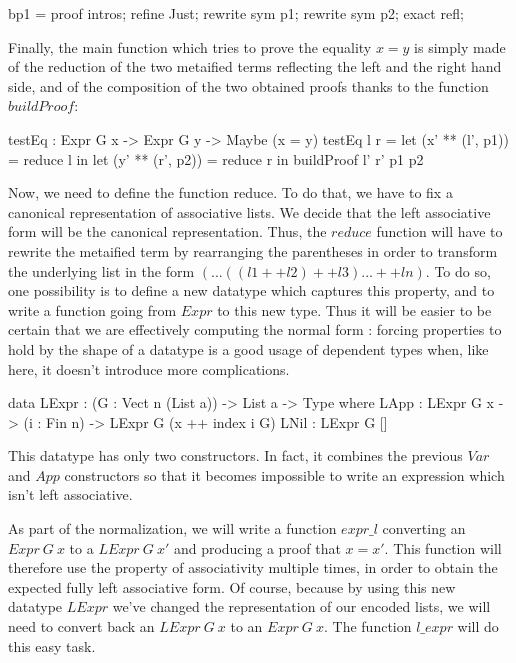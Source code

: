 \documentclass{sigplanconf}
\begin{document}
\begin{code}[caption=buildProof metavariable, captionpos=b, label=lst1:haskell2]
  bp1 = proof {
  intros;
  refine Just;
  rewrite sym p1;
  rewrite sym p2;
  exact refl;
}  
\end{code}
Finally, the main function which tries to prove the equality $x=y$ is simply made of the reduction of the two metaified terms reflecting the left and the right hand side, and of the composition of the two obtained proofs thanks to the function $buildProof$:
\begin{code}[caption=testEq, captionpos=b, label=lst1:haskell2]
  testEq : Expr G x -> Expr G y 
           -> Maybe (x = y)
  testEq l r = 
     let (x' ** (l', p1)) = reduce l in 
     let (y' ** (r', p2)) = reduce r in
        buildProof l' r' p1 p2
\end{code}
Now, we need to define the function reduce. To do that, we have to fix a canonical representation of associative lists. We decide that the left associative form will be the canonical representation. Thus, the $reduce$ function will have to rewrite the metaified term by rearranging the parentheses in order to transform the underlying list in the form $(...((l1 ++ l2) ++ l3) ... ++ ln)$. To do so, one possibility is to define a new datatype which captures this property, and to write a function going from $Expr$ to this new type. Thus it will be easier to be certain that we are effectively computing the normal form : forcing properties to hold by the shape of a datatype is a good usage of dependent types when, like here, it doesn't introduce more complications.
\begin{code}[caption=Reflected left associative lists, captionpos=b, label=lst1:haskell2]
  data LExpr : (G : Vect n (List a)) -> 
               List a -> Type where
       LApp : LExpr G x -> (i : Fin n) -> 
              LExpr G (x ++ index i G)
       LNil : LExpr G []
\end{code}
This datatype has only two constructors. In fact, it combines the previous $Var$ and $App$ constructors so that it becomes impossible to write an expression which isn't left associative.
 
As part of the normalization, we will write a function $expr\_l$ converting an $Expr\ G\ x$ to a $LExpr\ G\ x'$ and producing a proof that $x=x'$. This function will therefore use the property of associativity multiple times, in order to obtain the expected fully left associative form. Of course, because by using this new datatype $LExpr$ we've changed the representation of our encoded lists, we will need to convert back an $LExpr\ G\ x$ to an $Expr\ G\ x$. The function $l\_expr$ will do this easy task.
\end{document}
